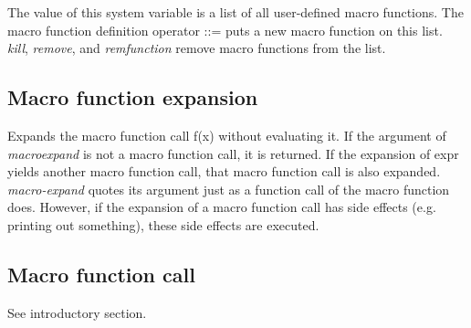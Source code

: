 \documentclass[../Maxima_Workbook.tex]{subfiles}
\begin{document}
\lz The value of this system variable is a list of all user-defined macro functions. The macro function definition operator ::= puts a new macro function on this list. \emph{kill}, \emph{remove}, and \emph{remfunction} remove macro functions from the list.

\subsection{Macro function expansion}

 \hfill {}

\lz Expands the macro function call f(x) without evaluating it. If the argument of \emph{macroexpand} is not a macro function call, it is returned. If the expansion of expr yields another macro function call, that macro function call is also expanded. \emph{macro-expand} quotes its argument just as a function call of the macro function does. However, if the expansion of a macro function call has side effects (e.g. printing out something), these side effects are executed.

\subsection{Macro function call}

See introductory section.
\end{document}

